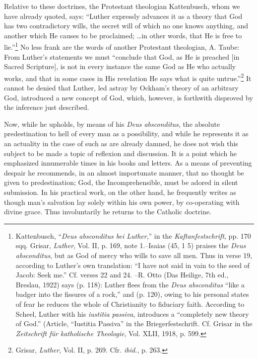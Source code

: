 Relative to these doctrines, the Protestant theologian Kattenbusch, whom
we have already quoted, says: “Luther expressly advances it as a theory that
God has two contradictory wills, the secret will of which no one knows anything,
and another which He causes to be proclaimed; \dots in other words,
that He is free to lie.”\footnote
{Kattenbusch, “\textit{Deus absconditus bei Luther},” in the \textit{Kaftanfestschrift}, pp. 170 sqq.
Grisar, \textit{Luther}, Vol. II, p. 169, note 1.--Isaias (45, 1 5) praises the \textit{Deus absconditus}, but as
God of mercy who wills to save all men. Thus in verse 19, according to Luther’s own
translation: “I have not said in vain to the seed of Jacob: Seek me.” Cf. verses 22 and 24.
--R. Otto (Das Heilige, 7th ed., Breslau, 1922) says (p. 118): Luther flees from the \textit{Deus
absconditus} “like a badger into the fissures of a rock,” and (p. 120), owing to his personal
states of fear he reduces the whole of Christianity to fiduciary faith. According to Scheel,
Luther with his \textit{iustitia passiva}, introduces a “completely new theory of God.” (Article,
“Iustitia Passiva” in the Briegerfestschrift. Cf. Grisar in the \textit{Zeitschrift für katholische
Theologie}, Vol. XLII, 1918, p. 599.}
No less frank are the words of another Protestant
theologian, A. Taube: From Luther’s statements we must “conclude that God,
as He is preached [in Sacred Scripture], is not in every instance the same
God as He who actually works, and that in some cases in His revelation He
says what is quite untrue.”\footnote{Grisar, \textit{Luther}, Vol. II, p. 269. Cfr. \textit{ibid.}, p. 263.}
It cannot be denied that Luther, led astray by
Ockham’s theory of an arbitrary God, introduced a new concept of God,
which, however, is forthwith disproved by the inference just described.

Now, while he upholds, by means of his \textit{Deus absconditus}, the absolute
predestination to hell of every man as a possibility, and while he represents it
as an actuality in the case of such as are already damned, he does not wish
this subject to be made a topic of reflexion and discussion. It is a point which
he emphasized innumerable times in his books and letters. As a means
of preventing despair he recommends, in an almost importunate manner, that no
thought be given to predestination; God, the Incomprehensible, must be
adored in silent submission. In his practical work, on the other hand, he frequently writes as though man’s salvation lay solely within his own power, by
co-operating with divine grace. Thus involuntarily he returns to the Catholic
doctrine.

